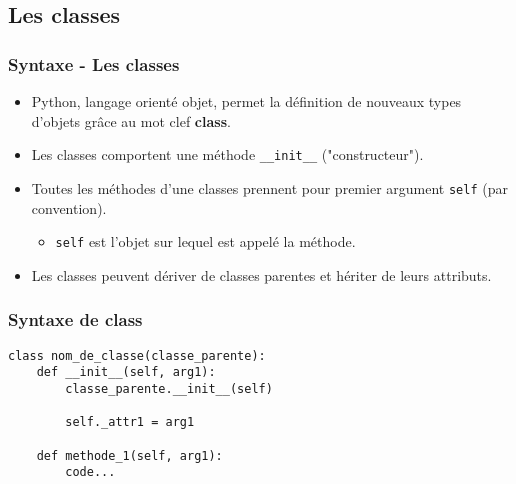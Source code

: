 \subsection{Les classes}
\begin{frame}[fragile]
  \frametitle{Syntaxe - Les classes}
  \begin{itemize}
    \item<1-> Python, langage orienté objet, permet la définition de nouveaux types d'objets grâce au mot clef {\bf class}.
    \item<2-> Les classes comportent une méthode \verb=__init__= ("constructeur").
    \item<3-> Toutes les méthodes d'une classes prennent pour premier argument \verb=self= (par convention).
    \begin{itemize}
      \item<3-> \verb=self= est l'objet sur lequel est appelé la méthode.
    \end{itemize}
    \item<4-> Les classes peuvent dériver de classes parentes et hériter de leurs attributs.
  \end{itemize}
\end{frame}

\begin{frame}[fragile]
  \frametitle{Syntaxe de class}
  \begin{lstlisting}
class nom_de_classe(classe_parente):
    def __init__(self, arg1):
        classe_parente.__init__(self)

        self._attr1 = arg1

    def methode_1(self, arg1):
        code...
  \end{lstlisting}
\end{frame}

\newpage
